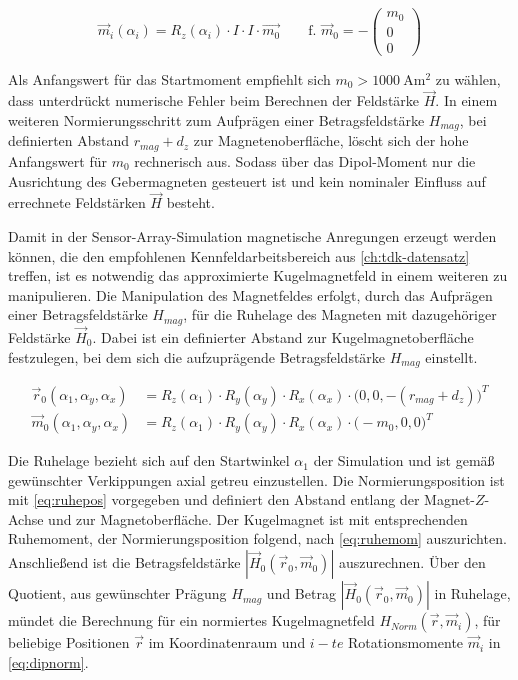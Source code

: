 \begin{equation}\label{eq:zrotov}
\vec{m}_i(\alpha_i)  = R_z(\alpha_i) \cdot I \cdot I \cdot \vec{m_0}  \qquad \textrm{f. } \vec{m}_0 = -\begin{pmatrix} m_0\\0\\0 \end{pmatrix}
\end{equation}


Als Anfangswert für das Startmoment empfiehlt sich $m_0 > \SI{1000}{\ampere\square\metre}$ zu wählen, dass unterdrückt numerische Fehler beim Berechnen der Feldstärke $\vec{H}$. In einem weiteren Normierungsschritt zum Aufprägen einer Betragsfeldstärke $H_{mag}$, bei definierten Abstand $r_{mag} + d_z$ zur Magnetenoberfläche, löscht sich der hohe Anfangswert für $m_0$ rechnerisch aus. Sodass über das Dipol-Moment nur die Ausrichtung des Gebermagneten gesteuert ist und kein nominaler Einfluss auf errechnete Feldstärken $\vec{H}$ besteht.


\clearpage


Damit in der Sensor-Array-Simulation magnetische Anregungen erzeugt werden können, die den empfohlenen Kennfeldarbeitsbereich aus \autoref{ch:tdk-datensatz} treffen, ist es notwendig das approximierte Kugelmagnetfeld in einem weiteren zu manipulieren. Die Manipulation des Magnetfeldes erfolgt, durch das Aufprägen einer Betragsfeldstärke $H_{mag}$, für die Ruhelage des Magneten mit dazugehöriger Feldstärke $\vec{H}_0$. Dabei ist ein definierter Abstand zur Kugelmagnetoberfläche festzulegen, bei dem sich die aufzuprägende Betragsfeldstärke $H_{mag}$ einstellt. 


\begin{align}\label{eq:ruhepos}
	\vec{r}_0(\alpha_1,\alpha_y,\alpha_x) &= R_z(\alpha_1) \cdot R_y(\alpha_y) \cdot R_x(\alpha_x) \cdot \big(0,0,-(r_{mag} + d_z)\big)^T \\
	\label{eq:ruhemom}
	\vec{m}_0(\alpha_1,\alpha_y,\alpha_x) &= R_z(\alpha_1) \cdot R_y(\alpha_y) \cdot R_x(\alpha_x) \cdot \big(-m_0,0,0\big)^T
\end{align}


Die Ruhelage bezieht sich auf den Startwinkel $\alpha_1$ der Simulation und ist gemäß gewünschter Verkippungen axial getreu einzustellen. Die Normierungsposition ist mit \autoref{eq:ruhepos} vorgegeben und definiert den Abstand entlang der Magnet-$Z$-Achse und zur Magnetoberfläche. Der Kugelmagnet ist mit entsprechenden Ruhemoment, der Normierungsposition folgend, nach \autoref{eq:ruhemom} auszurichten. Anschließend ist die Betragsfeldstärke $|\vec{H}_0(\vec{r}_0,\vec{m}_0)|$ auszurechnen. Über den Quotient, aus gewünschter Prägung $H_{mag}$ und Betrag $|\vec{H}_0(\vec{r}_0,\vec{m}_0)|$ in Ruhelage, mündet die Berechnung für ein normiertes Kugelmagnetfeld $H_{Norm}(\vec{r},\vec{m}_i)$, für beliebige Positionen $\vec{r}$ im Koordinatenraum und $i-te$ Rotationsmomente $\vec{m}_i$ in \autoref{eq:dipnorm}.


